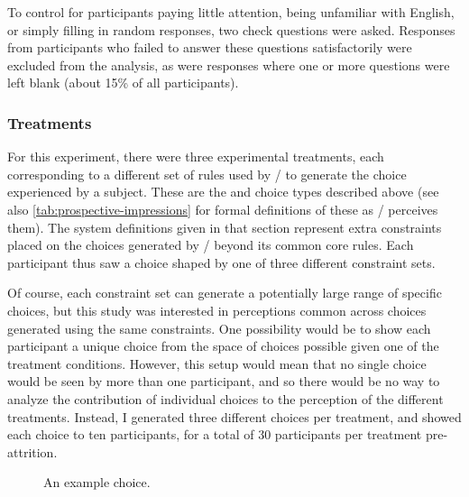 To control for participants paying little attention, being unfamiliar with English, or simply filling in random responses, two check questions were asked.
%
Responses from participants who failed to answer these questions satisfactorily were excluded from the analysis, as were responses where one or more questions were left blank (about 15\% of all participants).

\subsubsection{Treatments}

For this experiment, there were three experimental treatments, each corresponding to a different set of rules used by \dunyazad/ to generate the choice experienced by a subject.
%
These are the \obv{,} \rlx{,} and \dlm{,} choice types described above (see also \cref{tab:prospective-impressions} for formal definitions of these as \dunyazad/ perceives them).
%
The system definitions given in that section represent extra constraints placed on the choices generated by \dunyazad/ beyond its common core rules.
%
Each participant thus saw a choice shaped by one of three different constraint sets.


Of course, each constraint set can generate a potentially large range of specific choices, but this study was interested in perceptions common across choices generated using the same constraints.
%
One possibility would be to show each participant a unique choice from the space of choices possible given one of the treatment conditions.
%
However, this setup would mean that no single choice would be seen by more than one participant, and so there would be no way to analyze the contribution of individual choices to the perception of the different treatments.
%
Instead, I generated three different choices per treatment, and showed each choice to ten participants, for a total of 30 participants per treatment pre-attrition.

\begin{figure}[!h]
  \caption{An example choice.}
  \label{fig:results-exchoice}
\end{figure}

